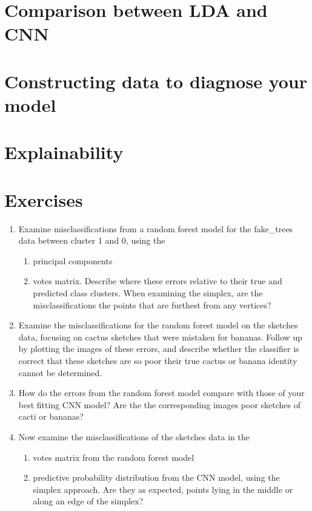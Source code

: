 \documentclass[
  letterpaper,
]{krantz}
\providecommand{\tightlist}{%
  \setlength{\itemsep}{0pt}\setlength{\parskip}{0pt}}\usepackage{longtable,booktabs,array}
\begin{document}

\section{Comparison between LDA and
CNN}\label{comparison-between-lda-and-cnn}

\section{Constructing data to diagnose your
model}\label{constructing-data-to-diagnose-your-model}

\section{Explainability}\label{explainability}

\section*{Exercises}\label{exercises-17}


\begin{enumerate}
\def\labelenumi{\arabic{enumi}.}
\tightlist
\item
  Examine misclassifications from a random forest model for the
  fake\_trees data between cluster 1 and 0, using the

  \begin{enumerate}
  \def\labelenumii{\alph{enumii}.}
  \tightlist
  \item
    principal components
  \item
    votes matrix. Describe where these errors relative to their true and
    predicted class clusters. When examining the simplex, are the
    misclassifications the points that are furthest from any vertices?
  \end{enumerate}
\item
  Examine the misclassifications for the random forest model on the
  sketches data, focusing on cactus sketches that were mistaken for
  bananas. Follow up by plotting the images of these errors, and
  describe whether the classifier is correct that these sketches are so
  poor their true cactus or banana identity cannot be determined.
\item
  How do the errors from the random forest model compare with those of
  your best fitting CNN model? Are the the corresponding images poor
  sketches of cacti or bananas?
\item
  Now examine the misclassifications of the sketches data in the

  \begin{enumerate}
  \def\labelenumii{\alph{enumii}.}
  \tightlist
  \item
    votes matrix from the random forest model
  \item
    predictive probability distribution from the CNN model, using the
    simplex approach. Are they as expected, points lying in the middle
    or along an edge of the simplex?
  \end{enumerate}
\end{enumerate}
\end{document}
